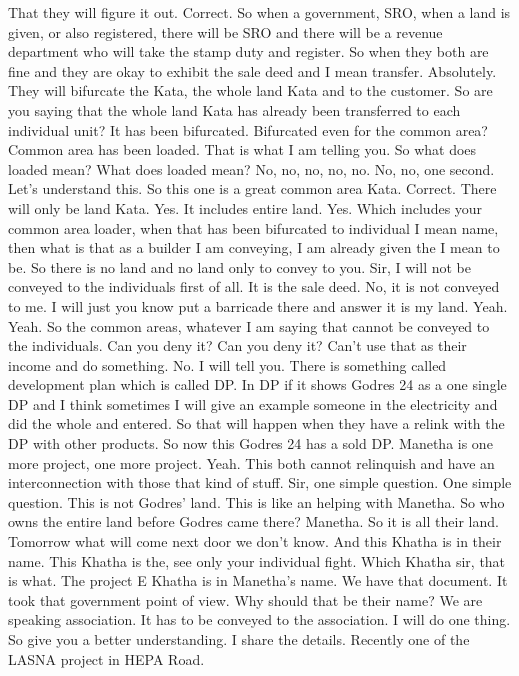 That they will figure it out.
Correct.
So when a government, SRO, when a land is given,
or also registered, there will be SRO and there will be
a revenue department who will take the stamp duty
and register.
So when they both are fine and they are okay to exhibit
the sale deed and I mean transfer.
Absolutely.
They will bifurcate the Kata,
the whole land Kata and to the customer.
So are you saying that the whole land Kata has already
been transferred to each individual unit?
It has been bifurcated.
Bifurcated even for the common area?
Common area has been loaded.
That is what I am telling you.
So what does loaded mean?
What does loaded mean?
No, no, no, no, no.
No, no, one second.
Let's understand this.
So this one is a great common area Kata.
Correct.
There will only be land Kata.
Yes.
It includes entire land.
Yes.
Which includes your common area loader,
when that has been bifurcated to individual
I mean name, then what is that as a builder
I am conveying, I am already given the
I mean to be.
So there is no land and no land only to convey to you.
Sir, I will not be conveyed to the individuals
first of all.
It is the sale deed.
No, it is not conveyed to me.
I will just you know put a barricade there
and answer it is my land.
Yeah.
Yeah.
So the common areas, whatever I am saying
that cannot be conveyed to the individuals.
Can you deny it?
Can you deny it?
Can't use that as their income and do something.
No.
I will tell you.
There is something called development plan
which is called DP.
In DP if it shows Godres 24 as a one single DP
and I think sometimes I will give an example
someone in the electricity and did the whole and entered.
So that will happen when they have a relink
with the DP with other products.
So now this Godres 24 has a sold DP.
Manetha is one more project, one more project.
Yeah.
This both cannot relinquish and have an interconnection
with those that kind of stuff.
Sir, one simple question.
One simple question.
This is not Godres' land.
This is like an helping with Manetha.
So who owns the entire land before Godres came there?
Manetha.
So it is all their land.
Tomorrow what will come next door we don't know.
And this Khatha is in their name.
This Khatha is the, see only your individual fight.
Which Khatha sir, that is what.
The project E Khatha is in Manetha's name.
We have that document.
It took that government point of view.
Why should that be their name?
We are speaking association.
It has to be conveyed to the association.
I will do one thing.
So give you a better understanding.
I share the details.
Recently one of the LASNA project in HEPA Road.
